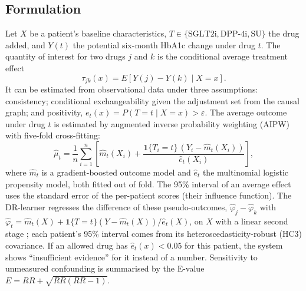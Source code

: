 \subsection{Formulation}
Let $X$ be a patient's baseline characteristics, $T\in\{\text{SGLT2i},\text{DPP-4i},\text{SU}\}$ the drug added, and $Y(t)$ the potential six-month HbA1c change under drug $t$. The quantity of interest for two drugs $j$ and $k$ is the conditional average treatment effect
\begin{equation}\tau_{jk}(x)=E\left[Y(j)-Y(k)\mid X=x\right].\end{equation}
It can be estimated from observational data under three assumptions: consistency; conditional exchangeability given the adjustment set from the causal graph; and positivity, $e_t(x)=P(T=t\mid X=x)>\varepsilon$. The average outcome under drug $t$ is estimated by augmented inverse probability weighting (AIPW) with five-fold cross-fitting:
\begin{equation}\hat\mu_t=\frac1n\sum_{i=1}^n\left[\hat m_t(X_i)+\frac{\mathbf 1\{T_i=t\}\,(Y_i-\hat m_t(X_i))}{\hat e_t(X_i)}\right],\end{equation}
where $\hat m_t$ is a gradient-boosted outcome model and $\hat e_t$ the multinomial logistic propensity model, both fitted out of fold. The 95\% interval of an average effect uses the standard error of the per-patient scores (their influence function). The DR-learner regresses the difference of these pseudo-outcomes, $\hat\varphi_j-\hat\varphi_k$ with $\hat\varphi_t=\hat m_t(X)+\mathbf 1\{T=t\}(Y-\hat m_t(X))/\hat e_t(X)$, on $X$ with a linear second stage \cite{kennedy2023}; each patient's 95\% interval comes from its heteroscedasticity-robust (HC3) covariance. If an allowed drug has $\hat e_t(x)<0.05$ for this patient, the system shows ``insufficient evidence'' for it instead of a number. Sensitivity to unmeasured confounding is summarised by the E-value $E=RR+\sqrt{RR(RR-1)}$.

